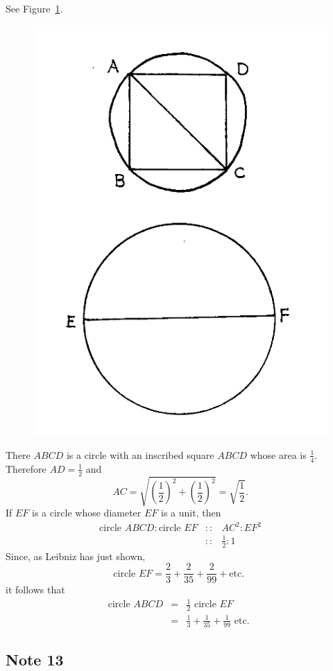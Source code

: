 \documentclass[polutonikogreek,english,twoside,openright]{article}
\begin{document}
See Figure~\ref{doubcirc}.
\begin{figure}[htp]
  \begin{center}
    \includegraphics[width=.5\textwidth]{fig/Figure63}
    \caption{}
    \label{doubcirc}
    \vspace{-10pt}
  \end{center}
\end{figure} There $ABCD$ is a circle with an inscribed square $ABCD$
whose area is $\frac{1}{4}$.  Therefore $AD = \frac{1}{2}$ and
$$AC = \sqrt{\left(\frac{1}{2}\right)^2 + \left(\frac{1}{2}\right)^2} = \sqrt{\frac{1}{2}}.$$
If $EF$ is a circle whose diameter $EF$ is a unit, then
\begin{eqnarray*}
  \mbox{circle }ABCD \!:\! \mbox{circle }EF &  :: & AC^2 \!:\! EF^2\\
                                            & ::& \frac{1}{2} \!:\! 1
\end{eqnarray*}
Since, as Leibniz has just shown,
$$\mbox{circle }EF = \frac{2}{3} + \frac{2}{35} + \frac{2}{99} + \mbox{etc. }$$
it follows that 
\begin{eqnarray*}
  \mbox{circle }ABCD & = & \frac{1}{2}\mbox{ circle }EF \\
                     & = & \frac{1}{3} +\frac{1}{35} + \frac{1}{99}\mbox{ etc. }
\end{eqnarray*}

\subsection*{Note 13}
\label{ctp13}
\end{document}
